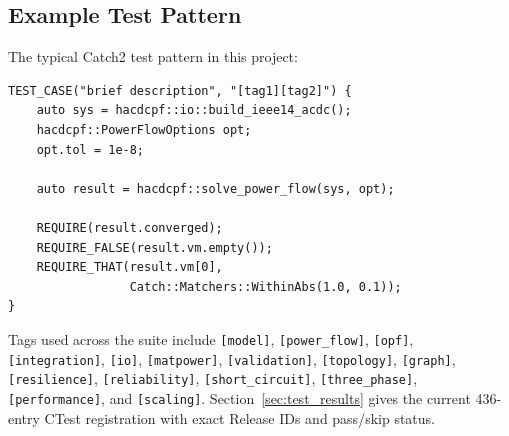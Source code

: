 \subsection{Example Test Pattern}

The typical Catch2 test pattern in this project:

\begin{verbatim}
TEST_CASE("brief description", "[tag1][tag2]") {
    auto sys = hacdcpf::io::build_ieee14_acdc();
    hacdcpf::PowerFlowOptions opt;
    opt.tol = 1e-8;

    auto result = hacdcpf::solve_power_flow(sys, opt);

    REQUIRE(result.converged);
    REQUIRE_FALSE(result.vm.empty());
    REQUIRE_THAT(result.vm[0],
                 Catch::Matchers::WithinAbs(1.0, 0.1));
}
\end{verbatim}

Tags used across the suite include \texttt{[model]}, \texttt{[power\_flow]},
\texttt{[opf]}, \texttt{[integration]}, \texttt{[io]}, \texttt{[matpower]},
\texttt{[validation]}, \texttt{[topology]}, \texttt{[graph]},
\texttt{[resilience]}, \texttt{[reliability]}, \texttt{[short\_circuit]},
\texttt{[three\_phase]}, \texttt{[performance]}, and \texttt{[scaling]}.
Section~\ref{sec:test_results} gives the current 436-entry CTest registration
with exact Release IDs and pass/skip status.
